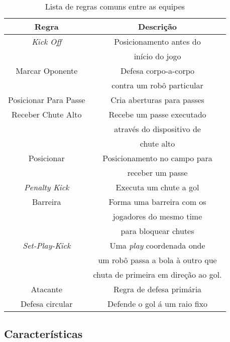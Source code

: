 \begin{table}
  \begin{center}
    \begin{tabular}{|c|c|}
      \hline
      Regra                  & Descrição \\
      \hline
      \textit{Kick Off}      & Posicionamento antes do\\
                             & início do jogo\\
      \hline
      Marcar Oponente        & Defesa corpo-a-corpo\\
                             & contra um robô particular\\
      \hline
      Posicionar Para Passe  & Cria aberturas para passes\\
      \hline
      Receber Chute Alto     & Recebe um passe executado\\
                             & através do dispositivo de\\
      & chute alto\\
      \hline
      Posicionar             & Posicionamento no campo para\\
                             & receber um passe\\
      \hline
      \textit{Penalty Kick}  & Executa um chute a gol\\
      \hline
      Barreira               & Forma uma barreira com os \\
                             & jogadores do mesmo time \\
                             & para bloquear chutes\\
      \hline
      \textit{Set-Play-Kick} & Uma \textit{play} coordenada onde\\
                             & um robô passa a bola à outro que \\
                             & chuta de primeira em direção ao gol.\\
      \hline
      Atacante               & Regra de defesa primária\\
      \hline
      Defesa circular        & Defende o gol á um raio fixo\\
      \hline
    \end{tabular}
  \caption{Lista de regras comuns entre as equipes}
  \label{regras}
  \end{center}
\end{table}


\subsection{Características}

